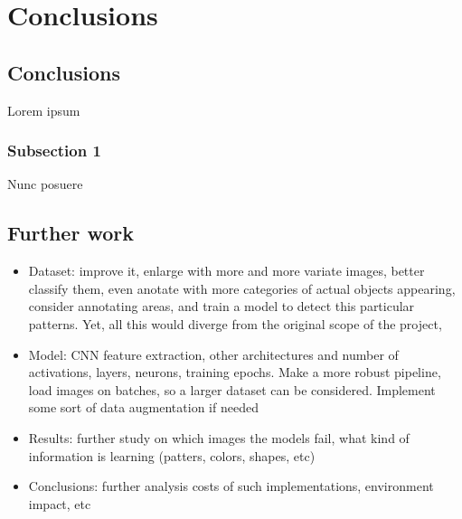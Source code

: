 
\chapter{Conclusions}

\label{Chapter6}


\section{Conclusions}

Lorem ipsum

\subsection{Subsection 1}

Nunc posuere

\section{Further work}

\begin{itemize}
	\item Dataset: improve it, enlarge with more and more variate images, better classify them, even anotate with more categories of actual objects appearing, consider annotating areas, and train a model to detect this particular patterns. Yet, all this would diverge from the original scope of the project,
	\item Model: CNN feature extraction, other architectures and number of activations, layers, neurons, training epochs. Make a more robust pipeline, load images on batches, so a larger dataset can be considered. Implement some sort of data augmentation if needed
	\item Results: further study on which images the models fail, what kind of information is learning (patters, colors, shapes, etc)
	\item Conclusions: further analysis costs of such implementations, environment impact, etc
\end{itemize}